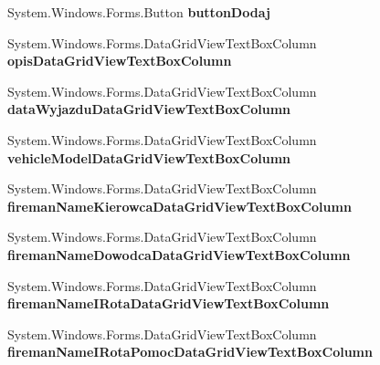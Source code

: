 \begin{DoxyCompactItemize}
System.\+Windows.\+Forms.\+Button {\bfseries button\+Dodaj}
\item 
\mbox{\label{class_statystyki___o_s_p_1_1_accident_list_form_aa87fc180f8000c149da9e186c51bb98e}} 
System.\+Windows.\+Forms.\+Data\+Grid\+View\+Text\+Box\+Column {\bfseries opis\+Data\+Grid\+View\+Text\+Box\+Column}
\item 
\mbox{\label{class_statystyki___o_s_p_1_1_accident_list_form_aeea874f666a71944bc1cc76913cba1e5}} 
System.\+Windows.\+Forms.\+Data\+Grid\+View\+Text\+Box\+Column {\bfseries data\+Wyjazdu\+Data\+Grid\+View\+Text\+Box\+Column}
\item 
\mbox{\label{class_statystyki___o_s_p_1_1_accident_list_form_a53a746b04798cee02c6cafba0eeb822e}} 
System.\+Windows.\+Forms.\+Data\+Grid\+View\+Text\+Box\+Column {\bfseries vehicle\+Model\+Data\+Grid\+View\+Text\+Box\+Column}
\item 
\mbox{\label{class_statystyki___o_s_p_1_1_accident_list_form_a743d623b03a473f68ed7a490e3aca356}} 
System.\+Windows.\+Forms.\+Data\+Grid\+View\+Text\+Box\+Column {\bfseries fireman\+Name\+Kierowca\+Data\+Grid\+View\+Text\+Box\+Column}
\item 
\mbox{\label{class_statystyki___o_s_p_1_1_accident_list_form_a9ca92619c7d3e77927b8ca8b3668eb1f}} 
System.\+Windows.\+Forms.\+Data\+Grid\+View\+Text\+Box\+Column {\bfseries fireman\+Name\+Dowodca\+Data\+Grid\+View\+Text\+Box\+Column}
\item 
\mbox{\label{class_statystyki___o_s_p_1_1_accident_list_form_af0b1da0b8634f9aeae94c5a28a434538}} 
System.\+Windows.\+Forms.\+Data\+Grid\+View\+Text\+Box\+Column {\bfseries fireman\+Name\+I\+Rota\+Data\+Grid\+View\+Text\+Box\+Column}
\item 
\mbox{\label{class_statystyki___o_s_p_1_1_accident_list_form_ae1cacca9ec62e353cf522084eca12b78}} 
System.\+Windows.\+Forms.\+Data\+Grid\+View\+Text\+Box\+Column {\bfseries fireman\+Name\+I\+Rota\+Pomoc\+Data\+Grid\+View\+Text\+Box\+Column}

\end{DoxyCompactItemize}
